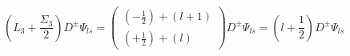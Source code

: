 \begin{equation}
\left( L_{3}+\frac{\Sigma _{3}}{2}\right) D^{\pm }\Psi _{ls}=\left(
\begin{array}{c}
\left( -\frac{1}{2}\right) +\left( l+1\right) \\
\left( +\frac{1}{2}\right) +\left( l\right)
\end{array}
\right) D^{\pm }\Psi _{ls}=\left( l+\frac{1}{2}\right) D^{\pm }\Psi _{ls}
\end{equation}

